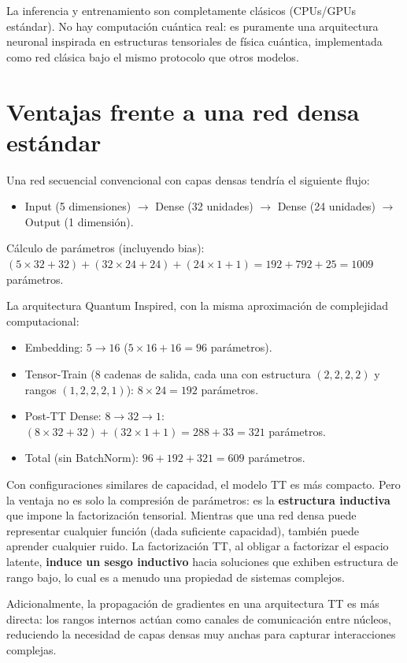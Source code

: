 La inferencia y entrenamiento son completamente clásicos (CPUs/GPUs estándar). No hay computación cuántica real: es puramente una arquitectura neuronal inspirada en estructuras tensoriales de física cuántica, implementada como red clásica bajo el mismo protocolo que otros modelos.

\section{Ventajas frente a una red densa estándar}

Una red secuencial convencional con capas densas tendría el siguiente flujo:

\begin{itemize}
  \item Input (5 dimensiones) $\to$ Dense (32 unidades) $\to$ Dense (24 unidades) $\to$ Output (1 dimensión).
\end{itemize}

Cálculo de parámetros (incluyendo bias):
$(5 \times 32 + 32) + (32 \times 24 + 24) + (24 \times 1 + 1) = 192 + 792 + 25 = 1009$ parámetros.

La arquitectura Quantum Inspired, con la misma aproximación de complejidad computacional:

\begin{itemize}
  \item Embedding: $5 \to 16$ ($5 \times 16 + 16 = 96$ parámetros).
  \item Tensor-Train (8 cadenas de salida, cada una con estructura $(2,2,2,2)$ y rangos $(1,2,2,2,1)$): $8 \times 24 = 192$ parámetros.
  \item Post-TT Dense: $8 \to 32 \to 1$: $(8 \times 32 + 32) + (32 \times 1 + 1) = 288 + 33 = 321$ parámetros.
  \item Total (sin BatchNorm): $96 + 192 + 321 = 609$ parámetros.
\end{itemize}

Con configuraciones similares de capacidad, el modelo TT es más compacto. Pero la ventaja no es solo la compresión de parámetros: es la \textbf{estructura inductiva} que impone la factorización tensorial. Mientras que una red densa puede representar cualquier función (dada suficiente capacidad), también puede aprender cualquier ruido. La factorización TT, al obligar a factorizar el espacio latente, \textbf{induce un sesgo inductivo} hacia soluciones que exhiben estructura de rango bajo, lo cual es a menudo una propiedad de sistemas complejos.

Adicionalmente, la propagación de gradientes en una arquitectura TT es más directa: los rangos internos actúan como canales de comunicación entre núcleos, reduciendo la necesidad de capas densas muy anchas para capturar interacciones complejas.
